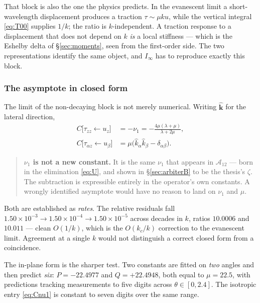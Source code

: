 \documentclass[11pt,a4paper]{article}
\newcommand{\Aop}{\mathcal{A}}
\begin{document}
That block is also the one the physics predicts.  In the evanescent limit a
short-wavelength displacement produces a traction $\tau\sim\mu k u$, while the
vertical integral \eqref{eq:T00} supplies $1/k$; the ratio is $k$-independent.
A traction response to a displacement that does not depend on $k$ \emph{is} a
local stiffness --- which is the Eshelby delta of \S\ref{sec:moments}, seen from
the first-order side.  The two representations identify the same object, and
$I_\infty$ has to reproduce exactly this block.

\subsubsection{The asymptote in closed form}

The limit of the non-decaying block is not merely numerical.  Writing
$\hat{\mathbf{k}}$ for the lateral direction,
\begin{align}
  C\bigl[\tau_{zz}\!\leftarrow\!u_z\bigr] &= -\nu_1
     = -\frac{4\mu(\lambda+\mu)}{\lambda+2\mu}, \label{eq:Cnu1}\\
  C\bigl[\tau_{\alpha z}\!\leftarrow\!u_\beta\bigr]
     &= \mu\bigl(\hat{k}_\alpha\hat{k}_\beta - \delta_{\alpha\beta}\bigr).
     \label{eq:Cinplane}
\end{align}

\begin{quote}
\textbf{$\nu_1$ is not a new constant.}  It is the same $\nu_1$ that appears in
$\Aop_{12}$ --- born in the elimination \eqref{eq:U}, and shown in
\S\ref{sec:arbiterB} to be the thesis's $\zeta$.  The subtraction is expressible
entirely in the operator's own constants.  A wrongly identified asymptote would
have no reason to land on $\nu_1$ and $\mu$.
\end{quote}

Both are established as \emph{rates}.  The relative residuals fall
$1.50\times10^{-3} \to 1.50\times10^{-4} \to 1.50\times10^{-5}$ across decades in
$k$, ratios $10.0006$ and $10.011$ --- clean $O(1/k)$, which is the $O(k_c/k)$
correction to the evanescent limit.  Agreement at a single $k$ would not
distinguish a correct closed form from a coincidence.

The in-plane form is the sharper test.  Two constants are fitted on \emph{two}
angles and then predict \emph{six}: $P = -22.4977$ and $Q = +22.4948$, both
equal to $\mu = 22.5$, with predictions tracking measurements to five digits
across $\theta\in[0,2.4]$.  The isotropic entry \eqref{eq:Cnu1} is constant to
seven digits over the same range.
\end{document}
